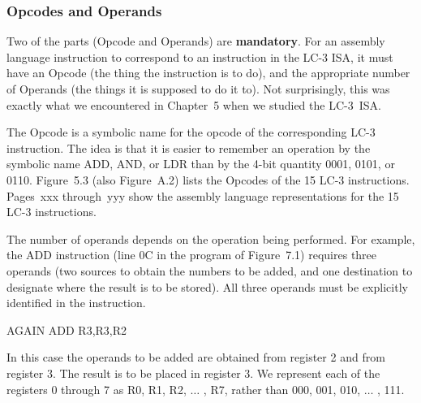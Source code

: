 \documentclass{patt}
\begin{document}
\subsubsection{Opcodes and Operands}

Two of the parts (Opcode and Operands) are {\bf mandatory}.  For an
assembly language instruction to correspond to an instruction in the 
LC-3 ISA, it must have an Opcode (the thing the instruction is to do),
and the appropriate number of Operands (the things it is supposed to
do it to).  Not surprisingly, this was exactly what we encountered in
Chapter~5 when we studied the LC-3~ISA.

The Opcode is a symbolic name for the opcode of the corresponding
LC-3 instruction.  The idea is that it is easier to remember an
operation\vadjust{\pagebreak} by the \nobreak symbolic name ADD,
AND, or LDR than by the 4-bit quantity 0001, 0101, or 0110.
Figure~5.3 (also Figure~A.2) lists the Opcodes of the 15 LC-3
instructions.  Pages~xxx through~yyy show the assembly language
representations for the 15 LC-3 instructions.

The number of operands depends on the operation being performed.  For
example, the ADD instruction (line 0C in the program of Figure~7.1) 
requires three operands (two
sources to obtain the numbers to be added, and one destination to
designate where the result is to be stored).  All three operands must
be explicitly identified in the instruction.
\begin{colorverbatim}
AGAIN    ADD    R3,R3,R2
\end{colorverbatim}
In this case the operands to be added are obtained from register 2 and from
register 3. The result is to be placed in register 3.  We represent
each of the registers 0 through 7 as R0, R1, R2, $\ldots$ , R7,
rather than 000, 001, 010, $\ldots$ , 111.
\end{document}
